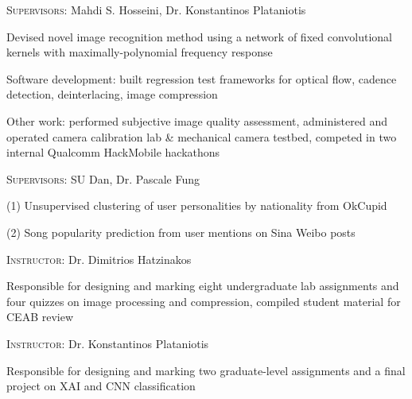 \documentclass[12pt]{cv_style}
\begin{document}
%
\textsc{Supervisors:} Mahdi S. Hosseini, Dr. Konstantinos Plataniotis
\begin{ditem}
	\item Devised novel image recognition method using a network of fixed convolutional kernels with maximally-polynomial frequency response
\end{ditem}
%
\begin{ditem}
	\item Software development: built regression test frameworks for optical flow, cadence detection, deinterlacing, image compression
	\item Other work: performed subjective image quality assessment, administered and operated camera calibration lab \& mechanical camera testbed, competed in two internal Qualcomm HackMobile hackathons
\end{ditem}
%
\textsc{Supervisors:} SU Dan, Dr. Pascale Fung
\begin{ditem}
	\item (1) Unsupervised clustering of user personalities by nationality from OkCupid
	\item (2) Song popularity prediction from user mentions on Sina Weibo posts
\end{ditem}
%

\textsc{Instructor:} Dr. Dimitrios Hatzinakos\\
\begin{ditem}
	\item Responsible for designing and marking eight undergraduate lab assignments and four quizzes on image processing and compression, compiled student material for CEAB review
\end{ditem}
\textsc{Instructor:} Dr. Konstantinos Plataniotis\\
\begin{ditem}
	\item Responsible for designing and marking two graduate-level assignments and a final project on XAI and CNN classification
\end{ditem}

%
\end{document}

